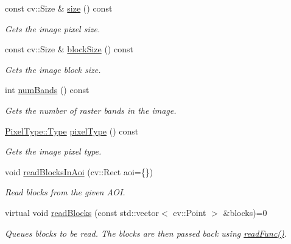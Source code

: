 \begin{DoxyCompactItemize}
const cv\+::\+Size \& \hyperlink{group___imagery_module_gae6d433d58e379503c5556353caaff27d}{size} () const 
\begin{DoxyCompactList}\small\item\em Gets the image pixel size. \end{DoxyCompactList}\item 
const cv\+::\+Size \& \hyperlink{group___imagery_module_gac789478fe5998234df8f2f5ae85a6b85}{block\+Size} () const 
\begin{DoxyCompactList}\small\item\em Gets the image block size. \end{DoxyCompactList}\item 
int \hyperlink{group___imagery_module_gabbb556d9f5048249ae32197aeb90466c}{num\+Bands} () const 
\begin{DoxyCompactList}\small\item\em Gets the number of raster bands in the image. \end{DoxyCompactList}\item 
\hyperlink{namespacedg_1_1deepcore_1_1imagery_1_1_pixel_type_a5f0c62edf4601cbd15e52b381697069d}{Pixel\+Type\+::\+Type} \hyperlink{group___imagery_module_gaf5164921d6c4514a57e2aa7243e6c572}{pixel\+Type} () const 
\begin{DoxyCompactList}\small\item\em Gets the image pixel type. \end{DoxyCompactList}\item 
void \hyperlink{classdg_1_1deepcore_1_1imagery_1_1_geo_image_a145e48260cc4ea93ee5ce272e74ef07e}{read\+Blocks\+In\+Aoi} (cv\+::\+Rect aoi=\{\})
\begin{DoxyCompactList}\small\item\em Read blocks from the given A\+OI. \end{DoxyCompactList}\item 
virtual void \hyperlink{classdg_1_1deepcore_1_1imagery_1_1_geo_image_ab9967ec5b39d1a0247366ff2d32bc883}{read\+Blocks} (const std\+::vector$<$ cv\+::\+Point $>$ \&blocks)=0
\begin{DoxyCompactList}\small\item\em Queues blocks to be read. The blocks are then passed back using \hyperlink{classdg_1_1deepcore_1_1imagery_1_1_geo_image_a2eb4fdc320aee10e8afd337138e2e7e1}{read\+Func()}. \end{DoxyCompactList}\end{DoxyCompactItemize}
